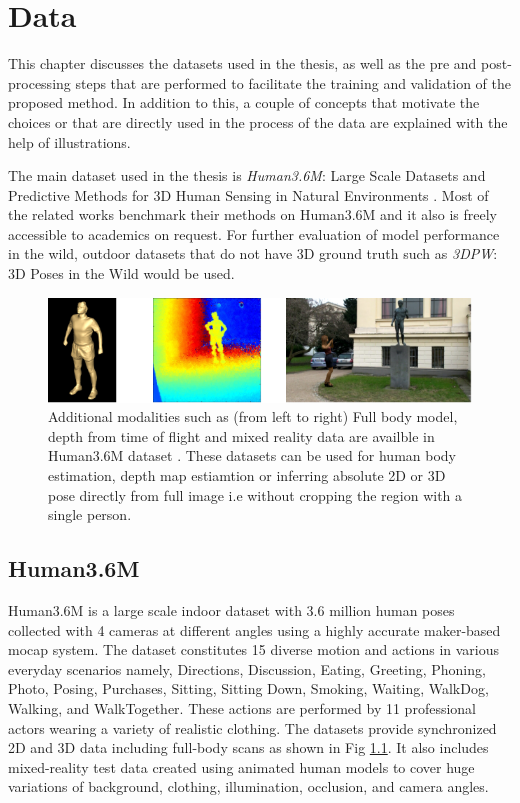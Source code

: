 \chapter{Data}
\label{chap:data}

This chapter discusses the datasets used in the thesis, as well as the pre and post-processing steps that are performed to facilitate the training and validation of the proposed method. In addition to this, a couple of concepts that motivate the choices or that are directly used in the process of the data are explained with the help of illustrations. 

The main dataset used in the thesis is \textit{Human3.6M}: Large Scale Datasets and Predictive Methods for 3D Human Sensing in Natural Environments \cite{H3.6}. Most of the related works benchmark their methods on Human3.6M and it also is freely accessible to academics on request. For further evaluation of model performance in the wild, outdoor datasets that do not have 3D ground truth such as \textit{3DPW}: 3D Poses in the Wild \cite{3dpw} would be used.

\begin{figure}[h]
    \centering
    \includegraphics[width=\textwidth]{figures/h36/modlities.png}
    \caption{Additional modalities such as (from left to right) Full body model, depth from time of flight and mixed reality data are availble in Human3.6M dataset \cite{H3.6}. These datasets can be used for human body estimation, depth map estiamtion or inferring absolute 2D or 3D pose directly from full image i.e without cropping the region with a single person.}
    \label{fig:h36_modality}
\end{figure}

\section{Human3.6M}
\label{sec:h36m}
Human3.6M is a large scale indoor dataset with 3.6 million human poses collected with 4 cameras at different angles using a highly accurate maker-based \ac{mocap} system. The dataset constitutes 15 diverse motion and actions in various everyday scenarios namely, Directions, Discussion, Eating, Greeting, Phoning, Photo, Posing, Purchases, Sitting, Sitting Down, Smoking, Waiting, WalkDog, Walking, and WalkTogether. These actions are performed by 11 professional actors wearing a variety of realistic clothing. The datasets provide synchronized 2D and 3D data including full-body scans as shown in Fig \ref{fig:h36_modality}. It also includes mixed-reality test data created using animated human models to cover huge variations of background, clothing, illumination, occlusion, and camera angles.

